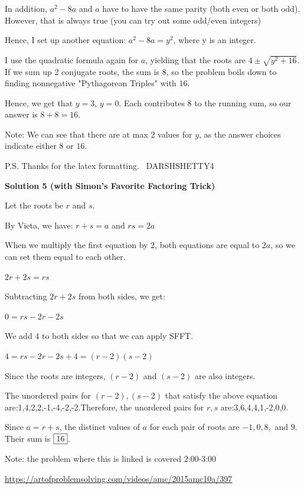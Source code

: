 \begin{enumerate}
 In addition, $a^2 - 8a$ and $a$ have to have the same parity (both even or both odd). However, that is always true (you can try out some odd/even integers)

 Hence, I set up another equation: $a^2 - 8a = y^2$, where y is an integer.

 I use the quadratic formula again for $a$, yielding that the roots are $4 \pm \sqrt{y^2 + 16}$. If we sum up 2 conjugate roots, the sum is $8$, so the problem boils down to finding nonnegative "Pythagorean Triples" with $16$. 

 Hence, we get that $y = 3$, $y = 0$. Each contributes $8$ to the running sum, so our answer is $8 + 8 = 16$.

 Note: We can see that there are at max 2 values for $y$, as the answer choices indicate either $8$ or $16$.

 
P.S. Thanks for the latex formatting. ~DARSHSHETTY4

 



\textbf{Solution 5 (with Simon's Favorite Factoring Trick)}

Let the roots be $r$ and $s$.

 By Vieta, we have: $r+s=a$ and $rs=2a$

 When we multiply the first equation by $2$, both equations are equal to $2a$, so we can set them equal to each other.

 $2r+2s=rs$ 

 Subtracting $2r+2s$ from both sides, we get:

 $0=rs-2r-2s$

 We add 4 to both sides so that we can apply SFFT.

 $4=rs-2r-2s+4=(r-2)(s-2)$

 Since the roots are integers, $(r-2)$ and $(s-2)$ are also integers. 

 The unordered pairs for {$(r-2),(s-2)$} that satisfy the above equation are:{1,4},{2,2},{-1,-4},{-2,-2}.Therefore, the unordered pairs for {$r,s$} are:{3,6},{4,4},{1,-2},{0,0}.

 
Since $a=r+s$, the distinct values of $a$ for each pair of roots are $-1, 0, 8,$ and $9.$Their sum is $\fbox{16}$.

 Note: the problem where this is linked is covered 2:00-3:00

 


 \href{https://artofproblemsolving.com/videos/amc/2015amc10a/397}{https://artofproblemsolving.com/videos/amc/2015amc10a/397}


\end{enumerate}
